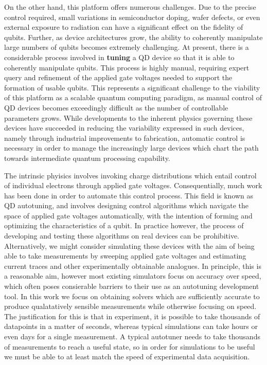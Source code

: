 \documentclass{article}
\begin{document}
On the other hand, this platform offers numerous challenges. Due to the precise control required, small variations in semiconductor doping, wafer defects, or even external exposure to radiation can have a significant effect on the fidelity of qubits. Further, as device architectures grow, the ability to coherently manipulate large numbers of qubits becomes extremely challenging. At present, there is a considerable process involved in \textbf{tuning} a QD device so that it is able to coherently manipulate qubits. This process is highly manual, requiring expert query and refinement of the applied gate voltages needed to support the formation of usable qubits. This represents a significant challenge to the viability of this platform as a scalable quantum computing paradigm, as manual control of QD devices becomes exceedingly difficult as the number of controllable parameters grows. While developments to the inherent physics governing these devices have succeeded in reducing the variability expressed in such devices, namely through industrial improvements to fabrication, automatic control is necessary in order to manage the increasingly large devices which chart the path towards intermediate quantum processing capability.

The intrinsic phyisics involves invoking charge distributions which entail control of individual electrons through applied gate voltages. Consequentially, much work has been done in order to automate this control process. This field is known as QD autotuning, and involves designing control algorithms which navigate the space of applied gate voltages automatically, with the intention of forming and optimizing the characteristics of a qubit. In practice however, the process of developing and testing these algorithms on real devices can be prohibitive. Alternatively, we might consider simulating these devices with the aim of being able to take measurements by sweeping applied gate voltages and estimating current traces and other experimentally obtainable analogues. In principle, this is a reasonable aim, however most existing simulators focus on accuracy over speed, which often poses consierable barriers to their use as an autotuning development tool. In this work we focus on obtaining solvers which are sufficiently accurate to produce qualatatively sensible measurements while otherwise focusing on speed. The justification for this is that in experiment, it is possible to take thousands of datapoints in a matter of seconds, whereas typical simulations can take hours or even days for a single measurement. A typical autotuner needs to take thousands of measurements to reach a useful state, so in order for simulations to be useful we must be able to at least match the speed of experimental data acquisition.
\end{document}

